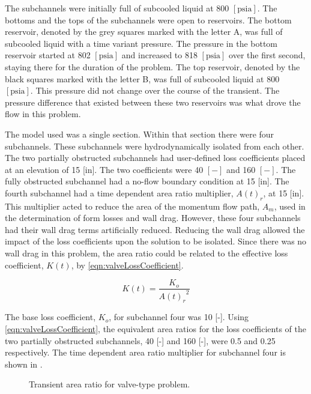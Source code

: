The subchannels were initially full of subcooled liquid at 800 $[ \text{psia}] $.
The bottoms and the tops of the subchannels were open to reservoirs.
The bottom reservoir, denoted by the grey squares marked with the letter A, was full of subcooled liquid with a time variant pressure.
The pressure in the bottom reservoir started at 802 $[ \text{psia}]$ and increased to 818 $[ \text{psia}]$ over the first second, staying there for the duration of the problem.
The top reservoir, denoted by the black squares marked with the letter B, was full of subcooled liquid at 800 $[\text{psia} ] $.
This pressure did not change over the course of the transient.
The pressure difference that existed between these two reservoirs was what drove the flow in this problem.

The model used was a single section.
Within that section there were four subchannels.
These subchannels were hydrodynamically isolated from each other.
The two partially obstructed subchannels had user-defined loss coefficients placed at an elevation of 15 [in].
The two coefficients were 40 $[-]$ and 160 $[-]$.
The fully obstructed subchannel had a no-flow boundary condition at 15 [in].
The fourth subchannel had a time dependent area ratio multiplier, $A(t)_r$, at 15 [in].
This multiplier acted to reduce the area of the momentum flow path, $A_m$, used in the determination of form losses and wall drag.
However, these four subchannels had their wall drag terms artificially reduced.
Reducing the wall drag allowed the impact of the loss coefficients upon the solution to be isolated.
Since there was no wall drag in this problem, the area ratio could be related to the effective loss coefficient, $K(t)$, by \eqref{eqn:valveLossCoefficient}.

\begin{equation}
\label{eqn:valveLossCoefficient}
K(t) = \frac{K_{o}}{{A(t)_r}^2}
\end{equation}

The base loss coefficient, $K_o$, for subchannel four was 10 [-].
Using \eqref{eqn:valveLossCoefficient}, the equivalent area ratios for the loss coefficients of the two partially obstructed subchannels, 40 [-] and 160 [-], were 0.5 and 0.25 respectively.
The time dependent area ratio multiplier for subchannel four is shown in .

\begin{figure}[h!tb]
\centering

\caption{Transient area ratio for valve-type problem.}
\label{fig:valveTransientArea}
\end{figure}

